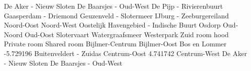 \documentclass[
]{book}
\newenvironment{Shaded}{\begin{snugshade}}{\end{snugshade}}
\newcommand{\FloatTok}[1]{\textcolor[rgb]{0.00,0.00,0.81}{#1}}
\newcommand{\NormalTok}[1]{#1}
\newcommand{\SpecialCharTok}[1]{\textcolor[rgb]{0.00,0.00,0.00}{#1}}
\begin{document}
\begin{Shaded}
\begin{Highlighting}[]
\NormalTok{  De Aker }\SpecialCharTok{{-}}\NormalTok{ Nieuw Sloten                                           }
\NormalTok{  De Baarsjes }\SpecialCharTok{{-}}\NormalTok{ Oud}\SpecialCharTok{{-}}\NormalTok{West                                           }
\NormalTok{  De Pijp }\SpecialCharTok{{-}}\NormalTok{ Rivierenbuurt                                          }
\NormalTok{  Gaasperdam }\SpecialCharTok{{-}}\NormalTok{ Driemond                                            }
\NormalTok{  Geuzenveld }\SpecialCharTok{{-}}\NormalTok{ Slotermeer                                          }
\NormalTok{  IJburg }\SpecialCharTok{{-}}\NormalTok{ Zeeburgereiland                                         }
\NormalTok{  Noord}\SpecialCharTok{{-}}\NormalTok{Oost                                                       }
\NormalTok{  Noord}\SpecialCharTok{{-}}\NormalTok{West                                                       }
\NormalTok{  Oostelijk Havengebied }\SpecialCharTok{{-}}\NormalTok{ Indische Buurt                           }
\NormalTok{  Osdorp                                                           }
\NormalTok{  Oud}\SpecialCharTok{{-}}\NormalTok{Noord                                                        }
\NormalTok{  Oud}\SpecialCharTok{{-}}\NormalTok{Oost                                                         }
\NormalTok{  Slotervaart                                                      }
\NormalTok{  Watergraafsmeer                                                  }
\NormalTok{  Westerpark                                                       }
\NormalTok{  Zuid                                                             }
\NormalTok{                                        room}
\NormalTok{hood                                     Private room Shared room}
\NormalTok{  Bijlmer}\SpecialCharTok{{-}}\NormalTok{Centrum                                                }
\NormalTok{  Bijlmer}\SpecialCharTok{{-}}\NormalTok{Oost                                                   }
\NormalTok{  Bos en Lommer                             }\SpecialCharTok{{-}}\FloatTok{5.729196}            
\NormalTok{  Buitenveldert }\SpecialCharTok{{-}}\NormalTok{ Zuidas                                         }
\NormalTok{  Centrum}\SpecialCharTok{{-}}\NormalTok{Oost                               }\FloatTok{4.741742}            
\NormalTok{  Centrum}\SpecialCharTok{{-}}\NormalTok{West                                                   }
\NormalTok{  De Aker }\SpecialCharTok{{-}}\NormalTok{ Nieuw Sloten                                         }
\NormalTok{  De Baarsjes }\SpecialCharTok{{-}}\NormalTok{ Oud}\SpecialCharTok{{-}}\NormalTok{West                                         }

\end{Highlighting}
\end{Shaded}
\end{document}
